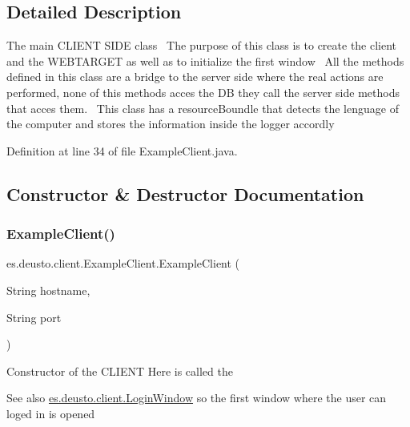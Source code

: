 \subsection{Detailed Description}
The main C\+L\+I\+E\+NT S\+I\+DE class~\newline
The purpose of this class is to create the client and the W\+E\+B\+T\+A\+R\+G\+ET as well as to initialize the first window~\newline
All the methods defined in this class are a bridge to the server side where the real actions are performed, none of this methods acces the DB they call the server side methods that acces them.~\newline
This class has a resource\+Boundle that detects the lenguage of the computer and stores the information inside the logger accordly 

Definition at line 34 of file Example\+Client.\+java.



\subsection{Constructor \& Destructor Documentation}
\mbox{\label{classes_1_1deusto_1_1client_1_1_example_client_afe4bf9d0ff661de1e0ba936df0ce807f}} 
\subsubsection{\texorpdfstring{Example\+Client()}{ExampleClient()}}
{\footnotesize\ttfamily es.\+deusto.\+client.\+Example\+Client.\+Example\+Client (\begin{DoxyParamCaption}\item[{String}]{hostname,  }\item[{String}]{port }\end{DoxyParamCaption})}

Constructor of the C\+L\+I\+E\+NT Here is called the \begin{DoxySeeAlso}{See also}
\hyperlink{classes_1_1deusto_1_1client_1_1_login_window}{es.\+deusto.\+client.\+Login\+Window} so the first window where the user can loged in is opened 
\end{DoxySeeAlso}

